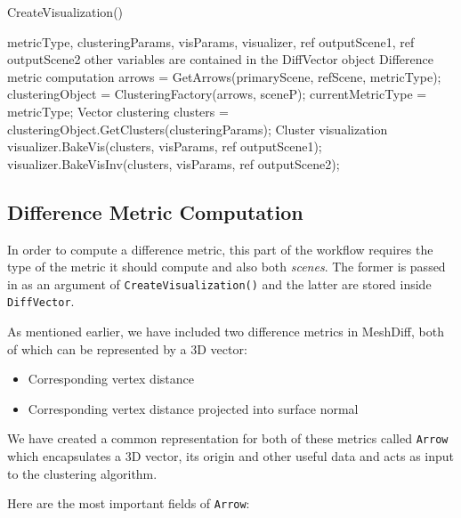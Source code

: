 \begin{algorithm}[H]
\caption{CreateVisualization()}
\label{algo:create_vis}
\begin{algorithmic}[1]

\Require metricType, clusteringParams, visParams, visualizer, ref outputScene1, ref outputScene2 \Comment other variables are contained in the DiffVector object
\Statex
\Statex \Comment Difference metric computation
	\State arrows = GetArrows(primaryScene, refScene, metricType);
    \State clusteringObject = ClusteringFactory(arrows, sceneP);
    \State currentMetricType = metricType;
\EndIf
\Statex \Comment Vector clustering
\State clusters = clusteringObject.GetClusters(clusteringParams);
\Statex \Comment Cluster visualization
\State visualizer.BakeVis(clusters, visParams, ref outputScene1);
\State visualizer.BakeVisInv(clusters, visParams, ref outputScene2);
\Statex
\Return
\end{algorithmic}
\end{algorithm}

\subsection{Difference Metric Computation}
\label{sec:analysis_metric}

In order to compute a difference metric, this part of the workflow requires the type of the metric it should compute and also both {\it scenes}. The former is passed in as an argument of \verb+CreateVisualization()+ and the latter are stored inside \verb+DiffVector+.

As mentioned earlier, we have included two difference metrics in MeshDiff, both of which can be represented by a 3D vector:

\begin{itemize}
\item Corresponding vertex distance
\item Corresponding vertex distance projected into surface normal
\end{itemize}

We have created a common representation for both of these metrics called \verb+Arrow+ which encapsulates a 3D vector, its origin and other useful data and acts as input to the clustering algorithm.

Here are the most important fields of \verb+Arrow+:

